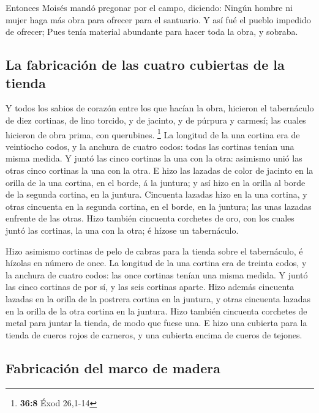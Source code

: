  Entonces Moisés mandó pregonar por el campo, diciendo:
Ningún hombre ni mujer haga más obra para ofrecer para el santuario. Y
así fué el pueblo impedido de ofrecer;  Pues tenía
material abundante para hacer toda la obra, y sobraba.

\hypertarget{la-fabricaciuxf3n-de-las-cuatro-cubiertas-de-la-tienda}{%
\subsection{La fabricación de las cuatro cubiertas de la
tienda}\label{la-fabricaciuxf3n-de-las-cuatro-cubiertas-de-la-tienda}}

 Y todos los sabios de corazón entre los que hacían la
obra, hicieron el tabernáculo de diez cortinas, de lino torcido, y de
jacinto, y de púrpura y carmesí; las cuales hicieron de obra prima, con
querubines. \footnote{\textbf{36:8} Éxod 26,1-14}  La
longitud de la una cortina era de veintiocho codos, y la anchura de
cuatro codos: todas las cortinas tenían una misma medida.
 Y juntó las cinco cortinas la una con la otra: asimismo
unió las otras cinco cortinas la una con la otra.  E hizo
las lazadas de color de jacinto en la orilla de la una cortina, en el
borde, á la juntura; y así hizo en la orilla al borde de la segunda
cortina, en la juntura.  Cincuenta lazadas hizo en la una
cortina, y otras cincuenta en la segunda cortina, en el borde, en la
juntura; las unas lazadas enfrente de las otras.  Hizo
también cincuenta corchetes de oro, con los cuales juntó las cortinas,
la una con la otra; é hízose un tabernáculo.

 Hizo asimismo cortinas de pelo de cabras para la tienda
sobre el tabernáculo, é hízolas en número de once.  La
longitud de la una cortina era de treinta codos, y la anchura de cuatro
codos: las once cortinas tenían una misma medida.  Y
juntó las cinco cortinas de por sí, y las seis cortinas aparte.
 Hizo además cincuenta lazadas en la orilla de la
postrera cortina en la juntura, y otras cincuenta lazadas en la orilla
de la otra cortina en la juntura.  Hizo también cincuenta
corchetes de metal para juntar la tienda, de modo que fuese una.
 E hizo una cubierta para la tienda de cueros rojos de
carneros, y una cubierta encima de cueros de tejones.

\hypertarget{fabricaciuxf3n-del-marco-de-madera}{%
\subsection{Fabricación del marco de
madera}\label{fabricaciuxf3n-del-marco-de-madera}}

